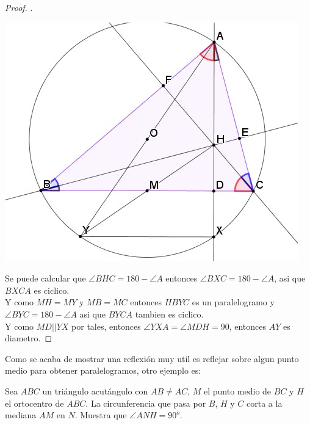 \documentclass[11pt]{scrartcl}
\begin{document}
    \begin{proof}
        .
        \begin{center}
         \includegraphics[scale=0.5]{AC7.jpg}
        \end{center}
        Se puede calcular que $\angle BHC=180-\angle A$ entonces $\angle BXC=180-\angle A$, asi que $BXCA$ es ciclico. \\
        Y como $MH=MY$ y $MB=MC$ entonces $HBYC$ es un paralelogramo y $\angle BYC=180-\angle A$ asi que $BYCA$ tambien es ciclico. \\
        Y como $MD || YX$ por tales, entonces $\angle YXA=\angle MDH=90$, entonces $AY$ es diametro.
    \end{proof}
    Como se acaba de mostrar una reflexi\'on muy util es reflejar sobre algun punto medio para obtener paralelogramos, otro ejemplo es:
    \begin{example}
        
    Sea $ABC$ un triángulo acutángulo con $AB \neq AC$, $M$ el punto medio de $BC$ y $H$ el
ortocentro de $ABC$. La circunferencia que pasa por $B$, $H$ y $C$ corta a la mediana $AM$ en
$N$. Muestra que $\angle ANH = 90^o$.
    
    \end{example}
\end{document}
